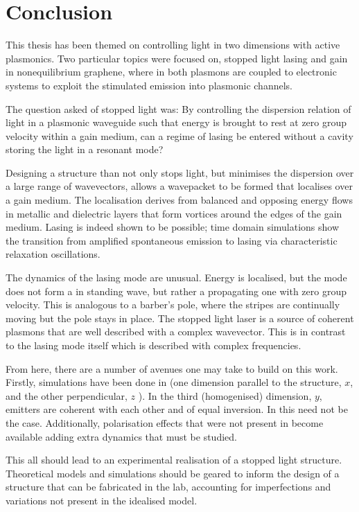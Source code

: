 \chapter{Conclusion}

This thesis has been themed on controlling light in two dimensions with active
plasmonics.
Two particular topics were focused on, stopped light lasing and gain in
nonequilibrium graphene, where in both plasmons are coupled to electronic
systems to exploit the stimulated emission into plasmonic channels.

The question asked of stopped light was:
By controlling the dispersion relation of light in a plasmonic waveguide such
that energy is brought to rest at zero group velocity within a gain medium, can
a regime of lasing be entered without a cavity storing the light in a resonant
mode?

Designing a structure than not only stops light, but minimises the dispersion
over a large range of wavevectors, allows a wavepacket to be formed that
localises over a gain medium.
The localisation derives from balanced and opposing energy flows in metallic and
dielectric layers that form vortices around the edges of the gain medium.
Lasing is indeed shown to be possible;
time domain simulations show the transition from amplified spontaneous emission
to lasing via characteristic relaxation oscillations.

The dynamics of the lasing mode are unusual.
Energy is localised, but the mode does not form a in standing wave, but rather a
propagating one with zero group velocity.
This is analogous to a barber’s pole, where the stripes are continually moving
but the pole stays in place.
The stopped light laser is a source of coherent plasmons that are well
described with a complex wavevector.
This is in contrast to the lasing mode itself which is described with complex
frequencies.

From here, there are a number of avenues one may take to build on this work.
Firstly, simulations have been done in \twod
(one dimension parallel to the structure, $x$, and the other perpendicular, $z$
).
In the third (homogenised) dimension, $y$, emitters are coherent with
each other and of equal inversion.
In \threed this need not be the case.
Additionally, polarisation effects that were not present in \twod become
available adding extra dynamics that must be studied.

This all should lead to an experimental realisation of a stopped light
structure.
Theoretical models and simulations should be geared to inform the design of a
structure that can be fabricated in the lab, accounting for imperfections and
variations not present in the idealised model.

